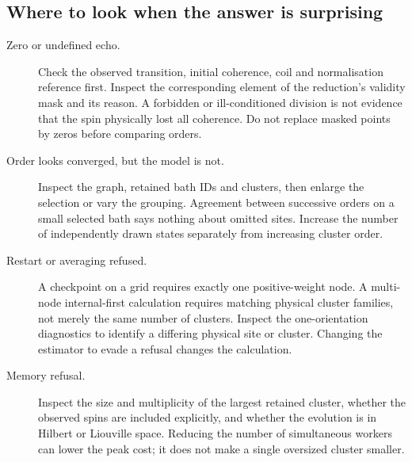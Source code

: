 \documentclass[11pt,a4paper]{article}
\begin{document}
\subsection{Where to look when the answer is surprising}
\begin{description}
\item[Zero or undefined echo.] Check the observed transition, initial coherence, coil and normalisation reference first. Inspect the corresponding element of the reduction's validity mask and its reason. A forbidden or ill-conditioned division is not evidence that the spin physically lost all coherence. Do not replace masked points by zeros before comparing orders.
\item[Order looks converged, but the model is not.] Inspect the graph, retained bath IDs and clusters, then enlarge the selection or vary the grouping. Agreement between successive orders on a small selected bath says nothing about omitted sites. Increase the number of independently drawn states separately from increasing cluster order.
\item[Restart or averaging refused.] A checkpoint on a grid requires exactly one positive-weight node. A multi-node internal-first calculation requires matching physical cluster families, not merely the same number of clusters. Inspect the one-orientation diagnostics to identify a differing physical site or cluster. Changing the estimator to evade a refusal changes the calculation.
\item[Memory refusal.] Inspect the size and multiplicity of the largest retained cluster, whether the observed spins are included explicitly, and whether the evolution is in Hilbert or Liouville space. Reducing the number of simultaneous workers can lower the peak cost; it does not make a single oversized cluster smaller.
\end{description}
\end{document}
